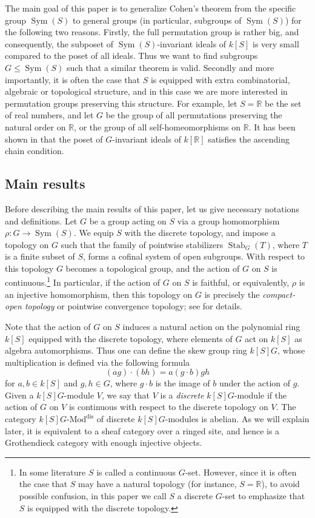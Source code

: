 \documentclass[11pt, reqno]{amsart}
\theoremstyle{plain}
\numberwithin{equation}{section}
\theoremstyle{definition}
\newcommand{\Mod}{{\textrm{-}\mathrm{Mod}}}
\DeclareMathOperator{\Sym}{Sym}
\DeclareMathOperator{\Stab}{Stab}
\newcommand{\dis}{{\mathrm{dis}}}
\begin{document}
The main goal of this paper is to generalize Cohen's theorem from the specific group $\Sym(S)$ to general groups (in particular, subgroups of $\Sym(S)$) for the following two reasons. Firstly, the full permutation group is rather big, and consequently, the subposet of $\Sym(S)$-invariant ideals of $k[S]$ is very small compared to the poset of all ideals. Thus we want to find subgroups $G \leqslant \Sym(S)$ such that a similar theorem is valid. Secondly and more importantly, it is often the case that $S$ is equipped with extra combinatorial, algebraic or topological structure, and in this case we are more interested in permutation groups preserving this structure. For example, let $S = \mathbb{R}$ be the set of real numbers, and let $G$ be the group of all permutations preserving the natural order on $\mathbb{R}$, or the group of all self-homeomorphisms on $\mathbb{R}$. It has been shown in \cite{LS} that the poset of $G$-invariant ideals of $k[\mathbb{R}]$ satisfies the ascending chain condition.


\subsection{Main results}

Before describing the main results of this paper, let us give necessary notations and definitions. Let $G$ be a group acting on $S$ via a group homomorphism $\rho: G \to \Sym(S)$. We equip $S$ with the discrete topology, and impose a topology on $G$ such that the family of pointwise stabilizers $\Stab_G(T)$, where $T$ is a finite subset of $S$, forms a cofinal system of open subgroups. With respect to this topology $G$ becomes a topological group, and the action of $G$ on $S$ is continuous.\footnote{In some literature $S$ is called a continuous $G$-set. However, since it is often the case that $S$ may have a natural topology (for instance, $S = \mathbb{R}$), to avoid possible confusion, in this paper we call $S$ a discrete $G$-set to emphasize that $S$ is equipped with the discrete topology.} In particular, if the action of $G$ on $S$ is faithful, or equivalently, $\rho$ is an injective homomorphism, then this topology on $G$ is precisely the \textit{compact-open topology} or pointwise convergence topology; see \cite{Are, Hu} for details.

Note that the action of $G$ on $S$ induces a natural action on the polynomial ring $k[S]$ equipped with the discrete topology, where elements of $G$ act on $k[S]$ as algebra automorphisms. Thus one can define the skew group ring $k[S]G$, whose multiplication is defined via the following formula
\[
(ag) \cdot (bh) = a (g \cdot b) gh
\]
for $a, b \in k[S]$ and $g, h \in G$, where $g \cdot b$ is the image of $b$ under the action of $g$. Given a $k[S]G$-module $V$, we say that $V$ is a \textit{discrete} $k[S]G$-module if the action of $G$ on $V$ is continuous with respect to the discrete topology on $V$. The category $k[S]G \Mod^{\dis}$ of discrete $k[S]G$-modules is abelian. As we will explain later, it is equivalent to a sheaf category over a ringed site, and hence is a Grothendieck category with enough injective objects.
\end{document}
